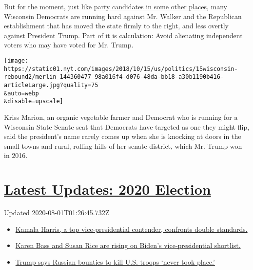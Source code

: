 But for the moment, just like
\href{https://www.nytimes.com/2018/08/15/us/politics/democrats-house-midterm-campaign.html}{party
candidates in some other places}, many Wisconsin Democrats are running
hard against Mr. Walker and the Republican establishment that has moved
the state firmly to the right, and less overtly against President Trump.
Part of it is calculation: Avoid alienating independent voters who may
have voted for Mr. Trump.

\texttt{[image: https://static01.nyt.com/images/2018/10/15/us/politics/15wisconsin-rebound2/merlin\_144360477\_98a016f4-d076-48da-bb18-a30b1190b416-articleLarge.jpg?quality=75\\\&auto=webp\\\&disable=upscale]}

Kriss Marion, an organic vegetable farmer and Democrat who is running
for a Wisconsin State Senate seat that Democrats have targeted as one
they might flip, said the president's name rarely comes up when she is
knocking at doors in the small towns and rural, rolling hills of her
senate district, which Mr. Trump won in 2016.

\hypertarget{latest-updates-2020-election}{%
\section{\texorpdfstring{\href{https://www.nytimes.com/2020/07/31/us/elections/biden-vs-trump.html?action=click\&pgtype=Article\&state=default\&region=MAIN_CONTENT_1\&context=storylines_live_updates}{Latest
Updates: 2020
Election}}{Latest Updates: 2020 Election}}\label{latest-updates-2020-election}}

Updated 2020-08-01T01:26:45.732Z

\begin{itemize}
\tightlist
\item
  \href{https://www.nytimes.com/2020/07/31/us/elections/biden-vs-trump.html?action=click\&pgtype=Article\&state=default\&region=MAIN_CONTENT_1\&context=storylines_live_updates\#link-29fdff45}{Kamala
  Harris, a top vice-presidential contender, confronts double
  standards.}
\item
  \href{https://www.nytimes.com/2020/07/31/us/elections/biden-vs-trump.html?action=click\&pgtype=Article\&state=default\&region=MAIN_CONTENT_1\&context=storylines_live_updates\#link-13ec3d9c}{Karen
  Bass and Susan Rice are rising on Biden's vice-presidential
  shortlist.}
\item
  \href{https://www.nytimes.com/2020/07/31/us/elections/biden-vs-trump.html?action=click\&pgtype=Article\&state=default\&region=MAIN_CONTENT_1\&context=storylines_live_updates\#link-49e9a016}{Trump
  says Russian bounties to kill U.S. troops `never took place.'}
\end{itemize}


